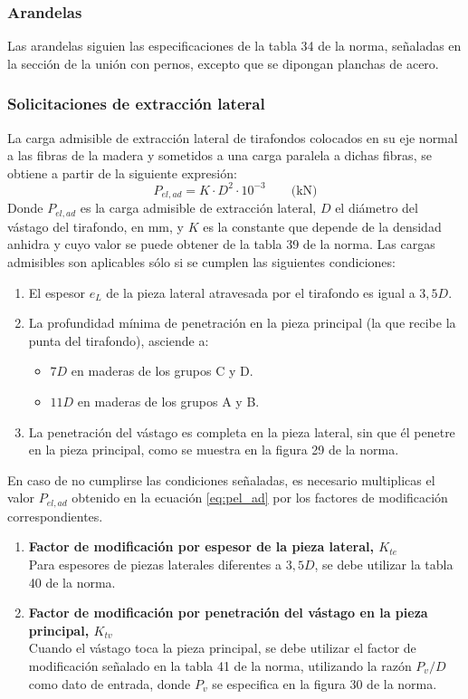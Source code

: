 \subsubsection{Arandelas}
Las arandelas siguien las especificaciones de la tabla 34 de la norma, señaladas en la sección de la unión con pernos, excepto que se dipongan planchas de acero.

\subsubsection{Solicitaciones de extracción lateral}
La carga admisible de extracción lateral de tirafondos colocados en su eje normal a las fibras de la madera y sometidos a una carga paralela a dichas fibras, se obtiene a partir de la siguiente expresión:
\begin{equation}\label{eq:pel_ad}
	P_{el,ad}=K\cdot D^2 \cdot 10^{-3} \qquad \text{(kN)}
\end{equation}
Donde $P_{el,ad}$ es la carga admisible de extracción lateral, $D$ el diámetro del vástago del tirafondo, en mm, y $K$ es la constante que depende de la densidad anhidra y cuyo valor se puede obtener de la tabla 39 de la norma.
Las cargas admisibles son aplicables sólo si se cumplen las siguientes condiciones:
\begin{enumerate}
	\item El espesor $e_L$ de la pieza lateral atravesada por el tirafondo es igual a $3,5D$.
	\item La profundidad mínima de penetración en la pieza principal (la que recibe la punta del tirafondo), asciende a:
	\begin{itemize}
		\item $7D$ en maderas de los grupos C y D.
		\item $11D$ en maderas de los grupos A y B.
	\end{itemize}
	\item La penetración del vástago es completa en la pieza lateral, sin que él penetre en la pieza principal, como se muestra en la figura 29 de la norma. 
\end{enumerate}

En caso de no cumplirse las condiciones señaladas, es necesario multiplicas el valor $P_{el,ad}$ obtenido en la ecuación \ref{eq:pel_ad} por los factores de modificación correspondientes.
\begin{enumerate}
	\item \textbf{Factor de modificación por espesor de la pieza lateral, $K_{te}$}\\
	Para espesores de piezas laterales diferentes a $3,5D$, se debe utilizar la tabla 40 de la norma.
	\item \textbf{Factor de modificación por penetración del vástago en la pieza principal, $K_{tv}$}\\
	Cuando el vástago toca la pieza principal, se debe utilizar el factor de modificación señalado en la tabla 41 de la norma, utilizando la razón $P_v / D$ como dato de entrada, donde $P_v$ se especifica en la figura 30 de la norma.	
\end{enumerate}

